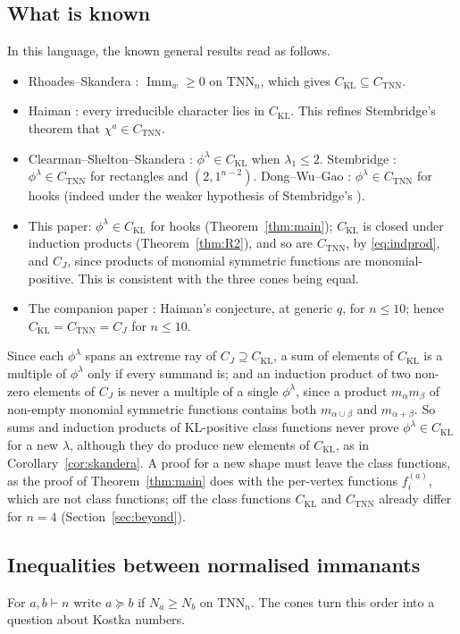 \documentclass[11pt]{amsart}
\theoremstyle{definition}
\theoremstyle{remark}
\newcommand{\Imm}{\operatorname{Imm}}
\newcommand{\TNN}{\mathrm{TNN}}
\newcommand{\CKL}{C_{\mathrm{KL}}}
\newcommand{\CTNN}{C_{\mathrm{TNN}}}
\newcommand{\CJ}{C_{J}}
\begin{document}
\subsection{What is known}
In this language, the known general results read as follows.
\begin{itemize}
\item Rhoades--Skandera \cite{RS06}: $\Imm_w\ge0$ on $\TNN_n$, which gives $\CKL\subseteq\CTNN$.
\item Haiman \cite[Lemma~1.1]{Hai}: every irreducible character lies in $\CKL$. This refines Stembridge's theorem \cite{Ste91} that $\chi^a\in\CTNN$.
\item Clearman--Shelton--Skandera \cite{CSS}: $\phi^\lambda\in\CKL$ when $\lambda_1\le2$. Stembridge \cite[Thms.~2.7, 2.8]{Ste92}: $\phi^\lambda\in\CTNN$ for rectangles and $(2,1^{n-2})$. Dong--Wu--Gao \cite{DWG}: $\phi^\lambda\in\CTNN$ for hooks (indeed under the weaker hypothesis of Stembridge's \cite[Question~2.9]{Ste92}).
\item This paper: $\phi^\lambda\in\CKL$ for hooks (Theorem~\ref{thm:main}); $\CKL$ is closed under induction products (Theorem~\ref{thm:R2}), and so are $\CTNN$, by \eqref{eq:indprod}, and $\CJ$, since products of monomial symmetric functions are monomial-positive. This is consistent with the three cones being equal.
\item The companion paper \cite{McN}: Haiman's conjecture, at generic $q$, for $n\le10$; hence $\CKL=\CTNN=\CJ$ for $n\le10$.
\end{itemize}
Since each $\phi^\lambda$ spans an extreme ray of $\CJ\supseteq\CKL$, a sum of elements of $\CKL$ is a multiple of $\phi^\lambda$ only if every summand is; and an induction product of two non-zero elements of $\CJ$ is never a multiple of a single $\phi^\lambda$, since a product $m_\alpha m_\beta$ of non-empty monomial symmetric functions contains both $m_{\alpha\cup\beta}$ and $m_{\alpha+\beta}$. So sums and induction products of KL-positive class functions never prove $\phi^\lambda\in\CKL$ for a new $\lambda$, although they do produce new elements of $\CKL$, as in Corollary~\ref{cor:skandera}. A proof for a new shape must leave the class functions, as the proof of Theorem~\ref{thm:main} does with the per-vertex functions $f^{(a)}_i$, which are not class functions; off the class functions $\CKL$ and $\CTNN$ already differ for $n=4$ (Section~\ref{sec:beyond}).

\subsection{Inequalities between normalised immanants}
For $a,b\vdash n$ write $a\succeq b$ if $N_a\ge N_b$ on $\TNN_n$. The cones turn this order into a question about Kostka numbers.
\end{document}
